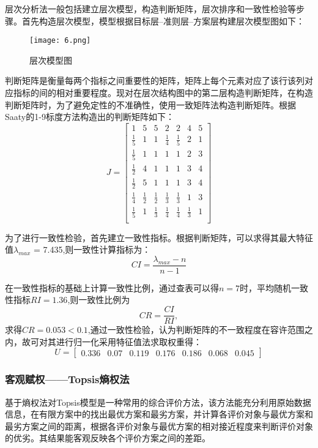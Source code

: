 \documentclass[withoutpreface,bwprint]{cumcmthesis} %
\begin{document}
层次分析法一般包括建立层次模型，构造判断矩阵，层次排序和一致性检验等步骤。首先构造层次模型，模型根据目标层–准则层–方案层构建层次模型图如下：
\begin{figure}[H]
	\centering
	\texttt{[image: 6.png]}
	\caption{层次模型图}
	\label{6}
\end{figure}
判断矩阵是衡量每两个指标之间重要性的矩阵，矩阵上每个元素对应了该行该列对应指标的间的相对重要程度。现对在层次结构图中的第二层构造判断矩阵，在构造判断矩阵时，为了避免定性的不准确性，使用一致矩阵法构造判断矩阵。根据Saaty的1-9标度方法构造出的判断矩阵如下：
\[J=\begin{bmatrix}%
1 & 5 & 5 & 2 &  2& 4 & 5\\
\frac{1}{5} & 1 & 1 & \frac{1}{4} & \frac{1}{5} & 2 & 1\\
\frac{1}{5} &  1& 1 & 1& 1 & 2 & 3\\
\frac{1}{2} & 4 &  1& 1 & 1 & 3 &4\\
\frac{1}{2} & 5 & 1 & 1 & 1 & 3 & 4\\
\frac{1}{4} &  \frac{1}{2}& \frac{1}{2} & \frac{1}{3}& \frac{1}{3} & 1 & 3\\
\frac{1}{5} & 1 &  \frac{1}{3}& \frac{1}{4} & \frac{1}{4} & \frac{1}{3} &1\\
\end{bmatrix}
\]

为了进行一致性检验，首先建立一致性指标。根据判断矩阵，可以求得其最大特征值$\lambda _{max}$ = 	7.435,则一致性计算指标为：
$$CI=\frac{\lambda _{max}-n}{n-1}$$

在一致性指标的基础上计算一致性比例，通过查表可以得$n=7$时，平均随机一致性指标$RI = 1.36$,则一致性比例为
$$CR=\frac{CI}{RI},$$求得$CR=0.053<0.1$,通过一致性检验，认为判断矩阵的不一致程度在容许范围之内，故可对其进行归一化采用特征值法求取权重得：$$U=\left[\begin{array}{lllllll}
0.336 & 0.07 & 0.119 & 0.176 & 0.186 & 0.068 & 0.045
\end{array}\right]
$$	
\subsubsection{客观赋权——Topsis熵权法}
基于熵权法对Topsis模型是一种常用的综合评价方法，该方法能充分利用原始数据信息，在有限方案中的找出最优方案和最劣方案，并计算各评价对象与最优方案和最劣方案之间的距离，根据各评价对象与最优方案的相对接近程度来判断评价对象的优劣。其结果能客观反映各个评价方案之间的差距。
\end{document}
